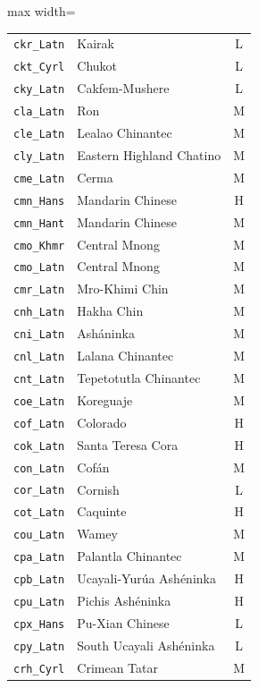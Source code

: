 {\begin{adjustbox}{max width=\textwidth}
\begin{tabular}{llc}
        \texttt{ckr\_Latn} & Kairak & L \\
        \texttt{ckt\_Cyrl} & Chukot & L \\
        \texttt{cky\_Latn} & Cakfem-Mushere & L \\
        \texttt{cla\_Latn} & Ron & M \\
        \texttt{cle\_Latn} & Lealao Chinantec & M \\
        \texttt{cly\_Latn} & Eastern Highland Chatino & M \\
        \texttt{cme\_Latn} & Cerma & M \\
        \texttt{cmn\_Hans} & Mandarin Chinese & H \\
        \texttt{cmn\_Hant} & Mandarin Chinese & M \\
        \texttt{cmo\_Khmr} & Central Mnong & M \\
        \texttt{cmo\_Latn} & Central Mnong & M \\
        \texttt{cmr\_Latn} & Mro-Khimi Chin & M \\
        \texttt{cnh\_Latn} & Hakha Chin & M \\
        \texttt{cni\_Latn} & Asháninka & M \\
        \texttt{cnl\_Latn} & Lalana Chinantec & M \\
        \texttt{cnt\_Latn} & Tepetotutla Chinantec & M \\
        \texttt{coe\_Latn} & Koreguaje & M \\
        \texttt{cof\_Latn} & Colorado & H \\
        \texttt{cok\_Latn} & Santa Teresa Cora & H \\
        \texttt{con\_Latn} & Cofán & M \\
        \texttt{cor\_Latn} & Cornish & L \\
        \texttt{cot\_Latn} & Caquinte & H \\
        \texttt{cou\_Latn} & Wamey & M \\
        \texttt{cpa\_Latn} & Palantla Chinantec & M \\
        \texttt{cpb\_Latn} & Ucayali-Yurúa Ashéninka & H \\
        \texttt{cpu\_Latn} & Pichis Ashéninka & H \\
        \texttt{cpx\_Hans} & Pu-Xian Chinese & L \\
        \texttt{cpy\_Latn} & South Ucayali Ashéninka & L \\
        \texttt{crh\_Cyrl} & Crimean Tatar & M \\

\end{tabular}
\end{adjustbox}}
